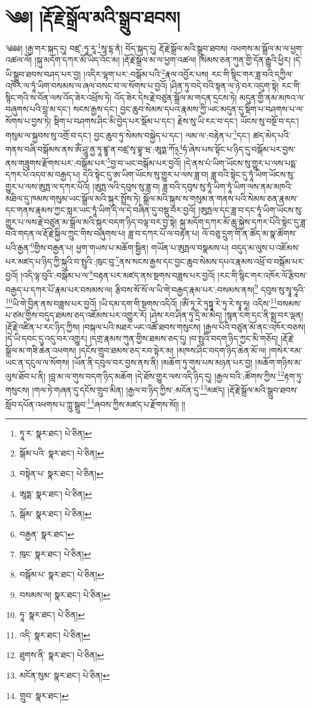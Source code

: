 \setcounter{footnote}{0} 
\chapter{༄༅། །རྡོ་རྗེ་སྒྲོལ་མའི་སྒྲུབ་ཐབས།}༄༅༅། །རྒྱ་གར་སྐད་དུ། བཛྲ་:ཏཱ་རཱ་\footnote{ཏཱ་ར་  སྣར་ཐང་།  པེ་ཅིན། }སཱ་དྷ་ནཾ། བོད་སྐད་དུ། རྡོ་རྗེ་སྒྲོལ་མའི་སྒྲུབ་ཐབས། འཕགས་མ་སྒྲོལ་མ་ལ་ཕྱག་འཚལ་ལོ། །སྐུ་མདོག་དཀར་མོ་ཡིད་འོང་མ། །རྡོ་རྗེ་སྒྲོལ་མ་ལ་ཕྱག་འཚལ། །སེམས་ཅན་ཀུན་གྱི་དོན་རྒྱུའི་ཕྱིར། །དེ་ཡི་སྒྲུབ་ཐབས་བཤད་པར་བྱ། །འདིར་ལྷག་པར་:བསྒོམ་པའི་\footnote{སྒོམ་པའི་  སྣར་ཐང་།  པེ་ཅིན། }རྣལ་འབྱོར་པས། རང་གི་སྙིང་གར་ཟླ་བའི་དཀྱིལ་འཁོར་ལ་ཏཱཾ་ཡིག་བསམས་ལ་ཞལ་བསང་བ་ལ་སོགས་པ་བྱའོ། །ཤིན་ཏུ་བདེ་བའི་སྟན་ལ་ཉེ་བར་འདུག་སྟེ། རང་གི་སྙིང་གའི་ས་བོན་ལས་འོད་ཟེར་འཕྲོས་ཏེ། འོད་ཟེར་དེས་རྗེ་བཙུན་སྒྲོལ་མ་གདན་དྲངས་ཏེ། མདུན་གྱི་ནམ་མཁའ་ལ་བཞུགས་པའི་བླ་མ་དང་། སངས་རྒྱས་དང་། བྱང་ཆུབ་སེམས་དཔའ་རྣམས་ཀྱི་ཡང་མདུན་དུ་སྡིག་པ་བཤགས་པ་ལ་སོགས་པ་བྱས་ཏེ། སྡིག་པ་བཤགས་ཤིང་མི་བྱེད་པར་སྡོམ་པ་དང་། རྗེས་སུ་ཡི་རང་བ་དང་། ཡོངས་སུ་བསྔོ་བ་དང་། གསུམ་ལ་སྐྱབས་སུ་འགྲོ་བ་དང་། བྱང་ཆུབ་ཏུ་སེམས་བསྐྱེད་པ་དང་། ལམ་ལ་:བརྟེན་པ་\footnote{བསྟེན་པ་  སྣར་ཐང་།  པེ་ཅིན། }དང་། ཚད་མེད་པའི་གནས་བཞི་བསྒོམས་ནས་ཨོཾ་ཤཱུ་ནྱ་ཏཱ་ཛྙཱ་ན་བཛྲ་སྭ་བྷཱ་ཝ་:ཨཱཏྨ་ཀོ྅\footnote{ཨཱཏྨ་  སྣར་ཐང་།  པེ་ཅིན། }ཧཾ་ཞེས་པས་སྟོང་པ་ཉིད་དུ་བསྒོམ་པར་བྱས་ནས་གཟུགས་རྫོགས་པར་:བསྒོམ་པར་\footnote{སྒོམ་  སྣར་ཐང་།  པེ་ཅིན། }བྱ་བ་ཡང་བསྒོམ་པར་བྱའོ། །དེ་ནས་པཾ་ཡིག་ཡོངས་སུ་གྱུར་པ་ལས་པདྨ་དཀར་པོ་འདབ་མ་བརྒྱད་པ། དེའི་སྟེང་དུ་ཨ་ཡིག་ཡོངས་སུ་གྱུར་པ་ལས་ཟླ་བ། ཟླ་བའི་སྟེང་དུ་ཏཱཾ་ཡིག་ཡོངས་སུ་གྱུར་པ་ལས་ཨུཏྤ་ལ་དཀར་པོའོ། །ཨུཏྤ་ལའི་དབུས་སུ་ཟླ་བ། ཟླ་བའི་དབུས་སུ་ཏཱཾ་ཡིག་ཏཱཾ་ཡིག་ལས་ནམ་མཁའི་མཐིལ་དུ་ཁམས་གསུམ་ཡང་སྒྲོལ་མའི་སྐུར་སྤྲོས་ཏེ། སྒྲོལ་མའི་སྐུས་ས་གསུམ་ན་གནས་པའི་སེམས་ཅན་རྣམས་དང་གནས་རྣམས་ཀྱང་སླར་ཡང་ཏཱཾ་ཡིག་དེ་ལ་དེ་བཞིན་དུ་བསྡུ་བར་བྱའོ། །ཨུཏྤལ་དང་ཟླ་བ་དང་ཏཱཾ་ཡིག་ཡོངས་སུ་གྱུར་པ་ལས་རྗེ་བཙུན་མ་སྒྲོལ་མའི་སྐུར་བདག་ཉིད་བལྟ་བར་བྱ་སྟེ། སྐུ་མདོག་དཀར་མོ་ཆུ་སྐྱེས་དཀར་པོའི་སྟེང་དུ་ཟླ་བའི་གདན་ལ་རྡོ་རྗེ་སྐྱིལ་ཀྲུང་གིས་བཞུགས་པ། ཟླ་བ་དཀར་པོ་ལ་བརྟེན་པ། ལོ་བཅུ་དྲུག་གི་ན་ཚོད་མ་སྣ་ཚོགས་པའི་རྒྱན་\footnote{བརྒྱན་  སྣར་ཐང་། }གྱིས་བརྒྱན་པ། ཕྱག་གཡས་པ་མཆོག་སྦྱིན། གཡོན་པ་ཨུཏྤལ་བསྣམས་པ། བདུད་མ་ལུས་པ་འཇོམས་པར་མཛད་པ་ཉིད་ཀྱི་སྐུའི་བ་སྤུའི་:ཁུང་བུ་\footnote{ཁུང་  སྣར་ཐང་།  པེ་ཅིན། }ནས་སངས་རྒྱས་དང་བྱང་ཆུབ་སེམས་དཔའ་རྣམས་འཕྲོ་བ་བསྒོམ་པར་བྱའོ། །འདི་ལྟ་བུའི་:བསྒོམ་པ་ལ་\footnote{བསྒོམ་པ་  སྣར་ཐང་།  པེ་ཅིན། }བརྟན་པར་མཛད་ནས་སྔགས་བཟླས་པར་བྱའོ། །རང་གི་སྙིང་གར་འཁོར་ལོ་རྩིབས་བརྒྱད་པ་དཀར་པོ་རྣམ་པར་བསམས་ལ། རྩིབས་སོ་སོ་ལ་ཡི་གེ་བརྒྱད་རྣམ་པར་:བསམས་ནས།\footnote{བསམས་ལ།  སྣར་ཐང་།  པེ་ཅིན། } དབུས་སུ་སྭཱ་ཧཱའི་\footnote{ཧཱ་  སྣར་ཐང་།  པེ་ཅིན། }ཡི་གེ་བྱིན་ནས་བཟླས་པར་བྱའོ། །ཡི་དམ་དག་གི་སྔགས་འདིའོ། །ཨོཾ་ཏཱ་རེ་ཏུཏྟཱ་རེ་ཏུ་རེ་སྭཱ་ཧཱ། འདིས་\footnote{འདི་  སྣར་ཐང་།  པེ་ཅིན། }བསམས་པ་ཙམ་གྱིས་བདུད་ཐམས་ཅད་འཇོམས་པར་འགྱུར་རོ། །ཤེས་རབ་ཤིན་ཏུ་དྲི་མ་མེད། །སྙན་ངག་དང་ནི་སྨྲ་བར་ལྡན། །རྡོ་རྗེ་འཛིན་པ་རང་ཉིད་ཀྱིས། །བསྐལ་པའི་མཐར་ཡང་འཚོ་ཐབས་གསུངས། །རྒྱལ་པོའི་བཙུན་མོ་ནང་འཁོར་བཅས། །དེ་ཡི་དབང་དུ་འདུ་བར་འགྱུར། །དགྲ་རྣམས་ཀུན་གྱིས་ཐམས་ཅད་དུ། །བ་སྤུའི་བདག་ཉིད་ཀྱང་མི་གཅོད། །རྡོ་རྗེ་སྒྲོལ་མ་གཟི་ཆེན་འཕགས། །དངོས་གྲུབ་ཐམས་ཅད་རབ་སྟེར་མ། །མཁས་ཤིང་བདག་ཉིད་ཆེན་མོ་ལ། །གསེར་རམ་ཡང་ན་དངུལ་ལ་སོགས། །ཡོན་ནི་དབུལ་བར་བྱས་ནས་ནི། །མཆོག་ཏུ་གུས་པས་མཉན་པར་བྱ། །མཆོག་གཉིས་མ་ལུས་ཐོབ་པ་ནི། །བླ་མ་ལ་གུས་བདག་ཉིད་མཆོག །དེ་ཐོས་གྱུར་ལས་འདི་ཉིད་དུ། །རྒྱལ་བའི་:ཚོགས་ཀྱིས་\footnote{ཐུགས་ནི་  སྣར་ཐང་།  པེ་ཅིན། }རྟག་ཏུ་གསུངས། །གལ་ཏེ་གཞན་དུ་དངོས་གྲུབ་མིན། །རྒྱལ་བ་ཉིད་ཀྱིས་:མངོན་དུ་\footnote{མངོན་སུམ་  སྣར་ཐང་།  པེ་ཅིན། }མཛད། །རྡོ་རྗེ་སྒྲོལ་མའི་སྒྲུབ་ཐབས་སློབ་དཔོན་འཕགས་པ་ཀླུ་སྒྲུབ་\footnote{གྲུབ་  སྣར་ཐང་། }ཞབས་ཀྱིས་མཛད་པ་རྫོགས་སོ།། །།